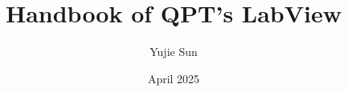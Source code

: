 \documentclass{article}
\title{Handbook of QPT's LabView}
\author{Yujie Sun}
\date{April 2025}
\begin{document}
\maketitle

\end{document}
